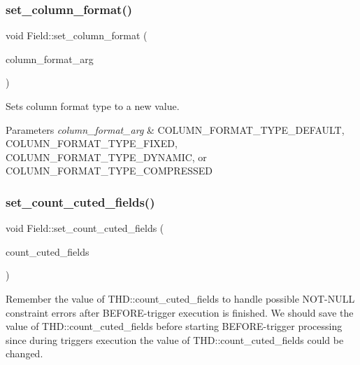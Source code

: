 \subsubsection{\texorpdfstring{set\+\_\+column\+\_\+format()}{set\_column\_format()}}
{\footnotesize\ttfamily void Field\+::set\+\_\+column\+\_\+format (\begin{DoxyParamCaption}\item[{column\+\_\+format\+\_\+type}]{column\+\_\+format\+\_\+arg }\end{DoxyParamCaption})\hspace{0.3cm}{\ttfamily [inline]}}

Sets column format type to a new value.


\begin{DoxyParams}{Parameters}
{\em column\+\_\+format\+\_\+arg} & C\+O\+L\+U\+M\+N\+\_\+\+F\+O\+R\+M\+A\+T\+\_\+\+T\+Y\+P\+E\+\_\+\+D\+E\+F\+A\+U\+LT, C\+O\+L\+U\+M\+N\+\_\+\+F\+O\+R\+M\+A\+T\+\_\+\+T\+Y\+P\+E\+\_\+\+F\+I\+X\+ED, C\+O\+L\+U\+M\+N\+\_\+\+F\+O\+R\+M\+A\+T\+\_\+\+T\+Y\+P\+E\+\_\+\+D\+Y\+N\+A\+M\+IC, or C\+O\+L\+U\+M\+N\+\_\+\+F\+O\+R\+M\+A\+T\+\_\+\+T\+Y\+P\+E\+\_\+\+C\+O\+M\+P\+R\+E\+S\+S\+ED \\
\hline
\end{DoxyParams}
\mbox{\label{classField_a1b865985a8c5b3d6f2c087d4869471a5}} 
\subsubsection{\texorpdfstring{set\+\_\+count\+\_\+cuted\+\_\+fields()}{set\_count\_cuted\_fields()}}
{\footnotesize\ttfamily void Field\+::set\+\_\+count\+\_\+cuted\+\_\+fields (\begin{DoxyParamCaption}\item[{enum\+\_\+check\+\_\+fields}]{count\+\_\+cuted\+\_\+fields }\end{DoxyParamCaption})\hspace{0.3cm}{\ttfamily [inline]}}

Remember the value of T\+H\+D\+::count\+\_\+cuted\+\_\+fields to handle possible N\+OT-\/N\+U\+LL constraint errors after B\+E\+F\+O\+RE-\/trigger execution is finished. We should save the value of T\+H\+D\+::count\+\_\+cuted\+\_\+fields before starting B\+E\+F\+O\+RE-\/trigger processing since during triggers execution the value of T\+H\+D\+::count\+\_\+cuted\+\_\+fields could be changed. \mbox{\label{classField_a87f79bf10641a6f90b4a960f53bdcccd}} 
